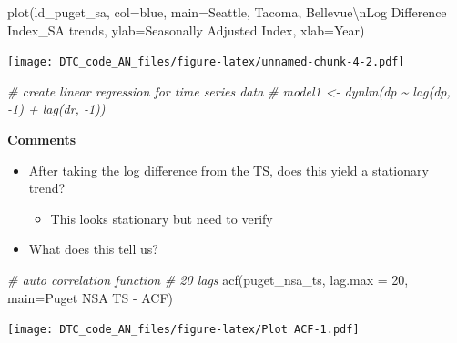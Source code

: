 \documentclass[
]{article}
\newenvironment{Shaded}{\begin{snugshade}}{\end{snugshade}}
\newcommand{\AttributeTok}[1]{\textcolor[rgb]{0.77,0.63,0.00}{#1}}
\newcommand{\CommentTok}[1]{\textcolor[rgb]{0.56,0.35,0.01}{\textit{#1}}}
\newcommand{\DecValTok}[1]{\textcolor[rgb]{0.00,0.00,0.81}{#1}}
\newcommand{\FunctionTok}[1]{\textcolor[rgb]{0.00,0.00,0.00}{#1}}
\newcommand{\NormalTok}[1]{#1}
\newcommand{\SpecialCharTok}[1]{\textcolor[rgb]{0.00,0.00,0.00}{#1}}
\newcommand{\StringTok}[1]{\textcolor[rgb]{0.31,0.60,0.02}{#1}}
\providecommand{\tightlist}{%
  \setlength{\itemsep}{0pt}\setlength{\parskip}{0pt}}
\begin{document}
\begin{Shaded}
\begin{Highlighting}[]
\FunctionTok{plot}\NormalTok{(ld\_puget\_sa, }\AttributeTok{col=}\StringTok{\textquotesingle{}blue\textquotesingle{}}\NormalTok{, }\AttributeTok{main=}\StringTok{\textquotesingle{}Seattle, Tacoma, Bellevue}\SpecialCharTok{\textbackslash{}n}\StringTok{Log Difference Index\_SA trends\textquotesingle{}}\NormalTok{, }\AttributeTok{ylab=}\StringTok{\textquotesingle{}Seasonally Adjusted Index\textquotesingle{}}\NormalTok{, }\AttributeTok{xlab=}\StringTok{\textquotesingle{}Year\textquotesingle{}}\NormalTok{)}
\end{Highlighting}
\end{Shaded}

\texttt{[image: DTC\_code\_AN\_files/figure-latex/unnamed-chunk-4-2.pdf]}

\begin{Shaded}
\begin{Highlighting}[]
\CommentTok{\# create linear regression for time series data}
\CommentTok{\# model1 \textless{}{-} dynlm(dp \textasciitilde{} lag(dp, {-}1) + lag(dr, {-}1))}
\end{Highlighting}
\end{Shaded}

\textbf{Comments}

\begin{itemize}
\item
  After taking the log difference from the TS, does this yield a
  stationary trend?

  \begin{itemize}
  \tightlist
  \item
    This looks stationary but need to verify
  \end{itemize}
\item
  What does this tell us?
\end{itemize}

\begin{Shaded}
\begin{Highlighting}[]
\CommentTok{\# auto correlation function}
\CommentTok{\# 20 lags}
\FunctionTok{acf}\NormalTok{(puget\_nsa\_ts, }\AttributeTok{lag.max =} \DecValTok{20}\NormalTok{, }\AttributeTok{main=}\StringTok{\textquotesingle{}Puget NSA TS {-} ACF\textquotesingle{}}\NormalTok{)}
\end{Highlighting}
\end{Shaded}

\texttt{[image: DTC\_code\_AN\_files/figure-latex/Plot ACF-1.pdf]}
\end{document}

